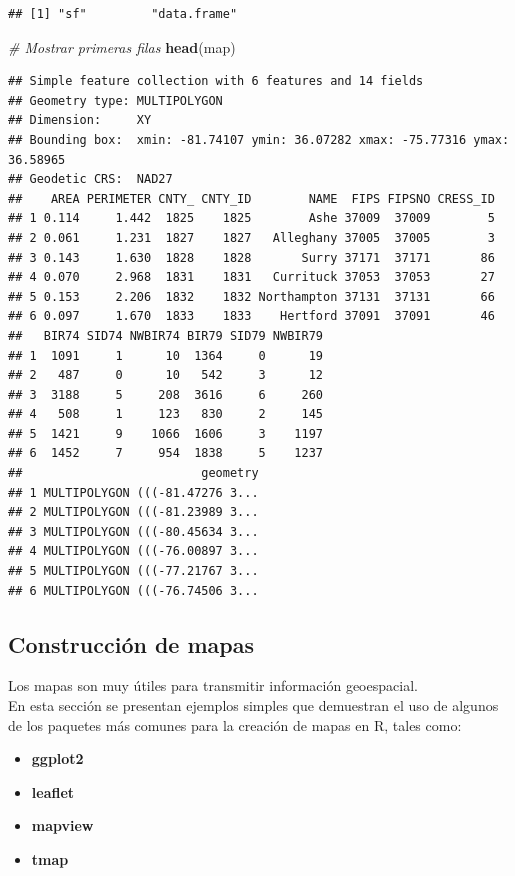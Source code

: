 \documentclass[
]{book}
\newenvironment{Shaded}{\begin{snugshade}}{\end{snugshade}}
\newcommand{\CommentTok}[1]{\textcolor[rgb]{0.56,0.35,0.01}{\textit{#1}}}
\newcommand{\FunctionTok}[1]{\textcolor[rgb]{0.13,0.29,0.53}{\textbf{#1}}}
\newcommand{\NormalTok}[1]{#1}
\providecommand{\tightlist}{%
  \setlength{\itemsep}{0pt}\setlength{\parskip}{0pt}}
\begin{document}
\begin{verbatim}
## [1] "sf"         "data.frame"
\end{verbatim}

\begin{Shaded}
\begin{Highlighting}[]
\CommentTok{\# Mostrar primeras filas}
\FunctionTok{head}\NormalTok{(map)}
\end{Highlighting}
\end{Shaded}

\begin{verbatim}
## Simple feature collection with 6 features and 14 fields
## Geometry type: MULTIPOLYGON
## Dimension:     XY
## Bounding box:  xmin: -81.74107 ymin: 36.07282 xmax: -75.77316 ymax: 36.58965
## Geodetic CRS:  NAD27
##    AREA PERIMETER CNTY_ CNTY_ID        NAME  FIPS FIPSNO CRESS_ID
## 1 0.114     1.442  1825    1825        Ashe 37009  37009        5
## 2 0.061     1.231  1827    1827   Alleghany 37005  37005        3
## 3 0.143     1.630  1828    1828       Surry 37171  37171       86
## 4 0.070     2.968  1831    1831   Currituck 37053  37053       27
## 5 0.153     2.206  1832    1832 Northampton 37131  37131       66
## 6 0.097     1.670  1833    1833    Hertford 37091  37091       46
##   BIR74 SID74 NWBIR74 BIR79 SID79 NWBIR79
## 1  1091     1      10  1364     0      19
## 2   487     0      10   542     3      12
## 3  3188     5     208  3616     6     260
## 4   508     1     123   830     2     145
## 5  1421     9    1066  1606     3    1197
## 6  1452     7     954  1838     5    1237
##                         geometry
## 1 MULTIPOLYGON (((-81.47276 3...
## 2 MULTIPOLYGON (((-81.23989 3...
## 3 MULTIPOLYGON (((-80.45634 3...
## 4 MULTIPOLYGON (((-76.00897 3...
## 5 MULTIPOLYGON (((-77.21767 3...
## 6 MULTIPOLYGON (((-76.74506 3...
\end{verbatim}

\subsection{Construcción de mapas}\label{construcciuxf3n-de-mapas}

Los mapas son muy útiles para transmitir información geoespacial.\\
En esta sección se presentan ejemplos simples que demuestran el uso de algunos de los paquetes más comunes para la creación de mapas en R, tales como:

\begin{itemize}
\tightlist
\item
  \textbf{ggplot2}\\
\item
  \textbf{leaflet}\\
\item
  \textbf{mapview}\\
\item
  \textbf{tmap}
\end{itemize}
\end{document}
